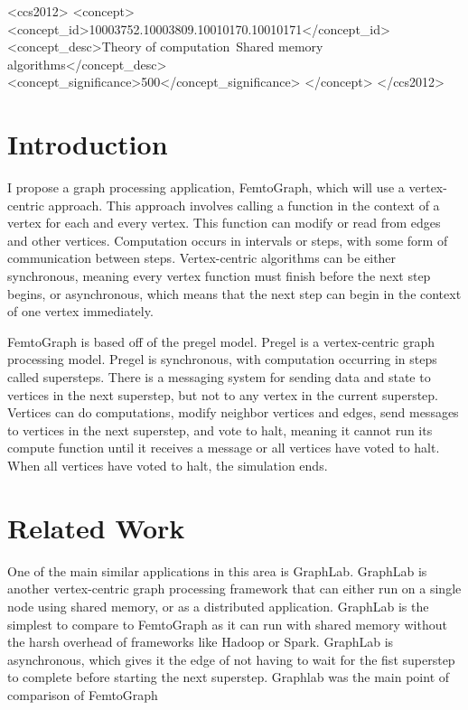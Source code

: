 \documentclass{sig-alternate-05-2015}
\begin{document}
%
\begin{CCSXML}
  <ccs2012>
  <concept>
  <concept_id>10003752.10003809.10010170.10010171</concept_id>
  <concept_desc>Theory of computation~Shared memory algorithms</concept_desc>
  <concept_significance>500</concept_significance>
  </concept>
  </ccs2012>
\end{CCSXML}

%
%

%
%
\printccsdesc



\section{Introduction}
\justify
I propose a graph processing application, FemtoGraph, which will use a vertex-centric approach. This approach involves calling a function in the context of a vertex for each and every vertex. This function can modify or read from edges and other vertices.  Computation occurs in intervals or steps, with some form of communication between steps. Vertex-centric algorithms can be either synchronous, meaning every vertex function must finish before the next step begins, or asynchronous, which means that the next step can begin in the context of one vertex immediately.  \cite{Gz:7}

FemtoGraph is based off of the pregel model. Pregel is a vertex-centric graph processing model. Pregel is synchronous, with computation occurring in steps called supersteps. There is a messaging system for sending data and state to vertices in the next superstep, but not to any vertex in the current superstep. Vertices can do computations, modify neighbor vertices and edges, send messages to vertices in the next superstep, and vote to halt, meaning it cannot run its compute function until it receives a message or all vertices have voted to halt. When all vertices have voted to halt, the simulation ends. \cite{Gz:4}

\section{Related Work}
\justify
One of the main similar applications in this area is GraphLab. GraphLab is another vertex-centric graph processing framework that can either run on a single node using shared memory, or as a distributed application. GraphLab is the simplest to compare to FemtoGraph as it can run with shared memory without the harsh overhead of frameworks like Hadoop or Spark. GraphLab is asynchronous, which gives it the edge of not having to wait for the fist superstep to complete before starting the next superstep. \cite{Gz:6} Graphlab was the main point of comparison of FemtoGraph 
\end{document}
